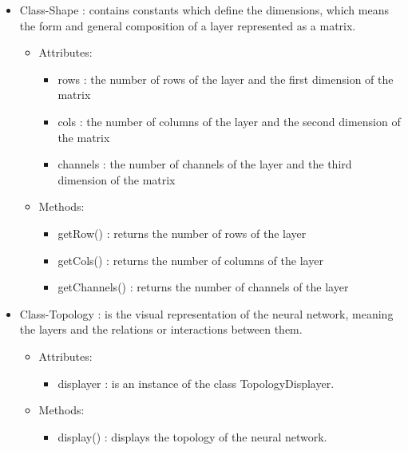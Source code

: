 \documentclass[parskip=full]{scrartcl}
\begin{document}
\begin{itemize}
	\item Class-Shape : contains constants which define the dimensions, which means the form and general composition of a layer represented as a matrix.
	\begin{itemize}
		\item Attributes:
		\begin{itemize}
			\item rows : the number of rows of the layer and the first dimension of the matrix
			\item cols : the number of columns of the layer and the second dimension of the matrix
			\item channels : the number of channels of the layer and the third dimension of the matrix
		\end{itemize}
		\item Methods:
		\begin{itemize}
			\item getRow() : returns the number of rows of the layer
			\item getCols() : returns the number of columns of the layer
			\item getChannels() : returns the number of channels of the layer
		\end{itemize}
	\end{itemize}


	\item Class-Topology : is the visual representation of the neural network, meaning the layers and the relations or interactions between them.
	\begin{itemize}
		\item Attributes:
		\begin{itemize}
			\item displayer : is an instance of the class TopologyDisplayer.
		\end{itemize}
		\item Methods:
		\begin{itemize}
			\item display() : displays the topology of the neural network.
		\end{itemize}
	\end{itemize}
\end{itemize}



\pagebreak
\end{document}
